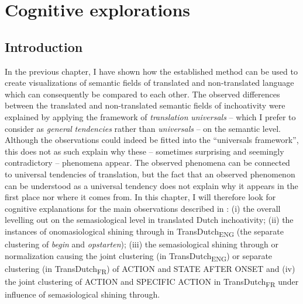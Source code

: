 \chapter{Cognitive explorations}
\label{sec:5}
\section{Introduction}
\label{sec:5.1}  
In the previous chapter, I have shown how the established method can be used to create visualizations of semantic fields of translated and non-translated language which can consequently be compared to each other. The observed differences between the translated and non-translated semantic fields of inchoativity were explained by applying the framework of \textit{translation} \textit{universals} – which I prefer to consider as \textit{general} \textit{tendencies} rather than \textit{universals} – on the semantic level. Although the observations could indeed be fitted into the “universals framework”, this does not as such explain why these – sometimes surprising and seemingly contradictory – phenomena appear. The observed phenomena can be connected to universal tendencies of translation, but the fact that an observed phenomenon can be understood as a universal tendency does not explain why it appears in the first place nor where it comes from. In this chapter, I will therefore look for cognitive explanations for the main observations described in : (i) the overall levelling out on the semasiological level in translated Dutch inchoativity; (ii) the instances of onomasiological shining through in TransDutch\textsubscript{ENG} (the separate clustering of \textit{begin} and \textit{opstarten}); (iii) the semasiological shining through or normalization causing the joint clustering (in TransDutch\textsubscript{ENG}) or separate clustering (in TransDutch\textsubscript{FR}) of ACTION and STATE AFTER ONSET and (iv) the joint clustering of ACTION and SPECIFIC ACTION in TransDutch\textsubscript{FR} under influence of semasiological shining through.

